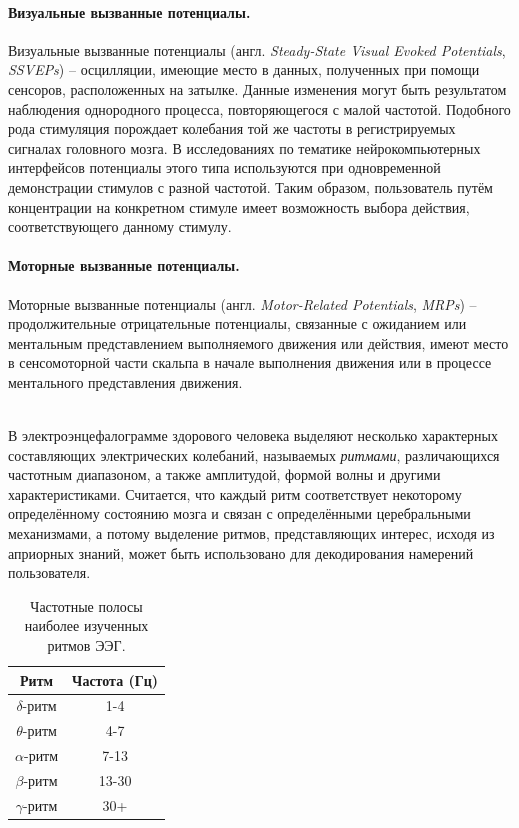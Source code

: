 \documentclass[12pt,a4paper,oneside,fleqn,leqno]{article}
\newcounter{pe} %
\newcommand*{\Nep}{\addtocounter{pe}{1}{\arabic{pe}$^{\circ}$.\;}}
\newcommand*{\NepS}{\mbox{} \\ \Nep}
\begin{document}
	\paragraph{Визуальные вызванные потенциалы.}
	\par Визуальные вызванные потенциалы (англ. {\it Steady-State Visual Evoked Potentials}, {\it SSVEPs}) -- осцилляции, имеющие место в данных, полученных при помощи сенсоров, расположенных на затылке. Данные изменения могут быть результатом наблюдения однородного процесса, повторяющегося с малой частотой. Подобного рода стимуляция порождает колебания той же частоты в регистрируемых сигналах головного мозга. В исследованиях по тематике нейрокомпьютерных интерфейсов потенциалы этого типа используются при одновременной демонстрации стимулов с разной частотой. Таким образом, пользователь путём концентрации на конкретном стимуле имеет возможность выбора действия, соответствующего данному стимулу.\\
	\paragraph{Моторные вызванные потенциалы.}
	\par Моторные вызванные потенциалы (англ. {\it Motor-Related Potentials}, {\it MRPs}) -- продолжительные отрицательные потенциалы, связанные с ожиданием или ментальным представлением выполняемого движения или действия, имеют место в сенсомоторной части скальпа в начале выполнения движения или в процессе ментального представления движения.
	\\ \NepS {\bf Частотная мозговая активность}
	\par В электроэнцефалограмме здорового человека выделяют несколько характерных составляющих электрических колебаний, называемых {\it ритмами}, различающихся частотным диапазоном, а также амплитудой, формой волны и другими характеристиками. Считается, что каждый ритм соответствует некоторому определённому состоянию мозга и связан с определёнными церебральными механизмами, а потому выделение ритмов, представляющих интерес, исходя из априорных знаний, может быть использовано для декодирования намерений пользователя.

\begin{table}[h]
\centering
\begin{tabular}{|c|c|}
\hline
Ритм & Частота (Гц) \\ \hline
$\delta$-ритм & 1-4 \\ \hline
$\theta$-ритм & 4-7 \\ \hline
$\alpha$-ритм & 7-13 \\ \hline
$\beta$-ритм & 13-30 \\ \hline
$\gamma$-ритм &  30+ \\ \hline
\end{tabular}
\caption{Частотные полосы наиболее изученных ритмов ЭЭГ.}
\end{table}
\end{document}
